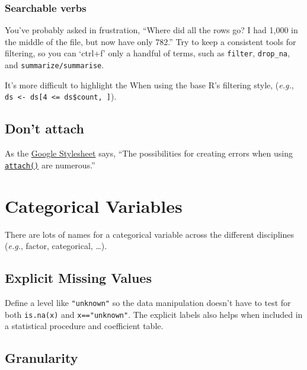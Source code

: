 \documentclass[
]{book}
\begin{document}
\hypertarget{style-filter-searchable}{%
\subsubsection{Searchable verbs}\label{style-filter-searchable}}

You've probably asked in frustration, ``Where did all the rows go? I had 1,000 in the middle of the file, but now have only 782.'' Try to keep a consistent tools for filtering, so you can `ctrl+f' only a handful of terms, such as
\texttt{filter},
\texttt{drop\_na}, and
\texttt{summarize/summarise}.

It's more difficult to highlight the When using the base R's filtering style, (\emph{e.g.}, \texttt{ds\ \textless{}-\ ds{[}4\ \textless{}=\ ds\$count,\ {]}}).

\hypertarget{style-attach}{%
\subsection{Don't attach}\label{style-attach}}

As the \href{https://google.github.io/styleguide/Rguide.html\#dont-use-attach}{Google Stylesheet} says, ``The possibilities for creating errors when using \href{https://stat.ethz.ch/R-manual/R-devel/library/base/html/attach.html}{\texttt{attach()}} are numerous.''

\hypertarget{style-factor}{%
\section{Categorical Variables}\label{style-factor}}

There are lots of names for a categorical variable across the different disciplines (\emph{e.g.}, factor, categorical, \ldots).

\hypertarget{style-factor-unknown}{%
\subsection{Explicit Missing Values}\label{style-factor-unknown}}

Define a level like \texttt{"unknown"} so the data manipulation doesn't have to test for both \texttt{is.na(x)} and \texttt{x=="unknown"}. The explicit labels also helps when included in a statistical procedure and coefficient table.

\hypertarget{style-factor-granularity}{%
\subsection{Granularity}\label{style-factor-granularity}}
\end{document}

